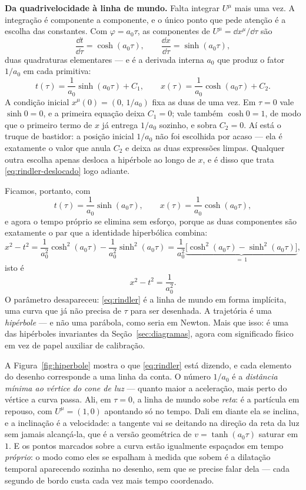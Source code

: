 \documentclass[12pt,a4paper,oneside]{book}
\theoremstyle{rgplain}
\theoremstyle{rgremark}
\begin{document}
\textbf{Da quadrivelocidade à linha de mundo.} Falta integrar $U^\mu$ mais uma
vez. A integração é componente a componente, e o único ponto que pede atenção é
a escolha das constantes. Com $\varphi=a_0\tau$, as componentes de
$U^\mu=\dd x^\mu/\dd\tau$ são
\[
  \frac{\dd t}{\dd\tau}=\cosh(a_0\tau),
  \qquad
  \frac{\dd x}{\dd\tau}=\sinh(a_0\tau),
\]
duas quadraturas elementares --- e é a derivada interna $a_0$ que produz o
fator $1/a_0$ em cada primitiva:
\[
  t(\tau)=\frac{1}{a_0}\sinh(a_0\tau)+C_1,
  \qquad
  x(\tau)=\frac{1}{a_0}\cosh(a_0\tau)+C_2 .
\]
A condição inicial $x^\mu(0)=(0,\,1/a_0)$ fixa as duas de uma vez. Em $\tau=0$
vale $\sinh 0=0$, e a primeira equação deixa $C_1=0$; vale também
$\cosh 0=1$, de modo que o primeiro termo de $x$ já entrega $1/a_0$ sozinho, e
sobra $C_2=0$. Aí está o truque de bastidor: a posição inicial $1/a_0$ não foi
escolhida por acaso --- ela é exatamente o valor que anula $C_2$ e deixa as duas
expressões limpas. Qualquer outra escolha apenas desloca a hipérbole ao longo de
$x$, e é disso que trata \eqref{eq:rindler-deslocado} logo adiante.

Ficamos, portanto, com
\[
  t(\tau)=\frac{1}{a_0}\sinh(a_0\tau),
  \qquad
  x(\tau)=\frac{1}{a_0}\cosh(a_0\tau),
\]
e agora o tempo próprio se elimina sem esforço, porque as duas componentes são
exatamente o par que a identidade hiperbólica combina:
\[
  x^2-t^2=\frac{1}{a_0^2}\cosh^2(a_0\tau)-\frac{1}{a_0^2}\sinh^2(a_0\tau)
   =\frac{1}{a_0^2}
    \underbrace{\bigl[\cosh^2(a_0\tau)-\sinh^2(a_0\tau)\bigr]}_{=\,1},
\]
isto é
\begin{equation}
  x^2-t^2=\frac{1}{a_0^{2}} .
  \label{eq:rindler}
\end{equation}
O parâmetro desapareceu: \eqref{eq:rindler} é a linha de mundo em forma
implícita, uma curva que já não precisa de $\tau$ para ser desenhada.
A trajetória é uma \emph{hipérbole} --- e não uma parábola, como seria em
Newton. Mais que isso: é uma das hipérboles invariantes da
Seção~\ref{sec:diagramas}, agora com significado físico em vez de papel
auxiliar de calibração.

A Figura~\ref{fig:hiperbole} mostra o que \eqref{eq:rindler} está dizendo, e
cada elemento do desenho corresponde a uma linha da conta. O número $1/a_0$ é a \emph{distância mínima ao vértice do cone
de luz} --- quanto maior a aceleração, mais perto do vértice a curva passa. Ali,
em $\tau=0$, a linha de mundo sobe \emph{reta}: é a partícula em repouso, com
$U^\mu=(1,0)$ apontando só no tempo. Dali em diante ela se inclina, e a
inclinação é a velocidade: a tangente vai se deitando na direção da reta da luz
sem jamais alcançá-la, que é a versão geométrica de $v=\tanh(a_0\tau)$ saturar
em $1$. E os pontos marcados sobre a curva estão igualmente espaçados em tempo
\emph{próprio}: o modo como eles se espalham à medida que sobem é a dilatação
temporal aparecendo sozinha no desenho, sem que se precise falar dela --- cada
segundo de bordo custa cada vez mais tempo coordenado.
\end{document}
